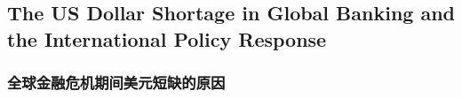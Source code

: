 \subsection{The US Dollar Shortage in Global Banking and the International Policy
Response}



\subsubsection{全球金融危机期间美元短缺的原因}




